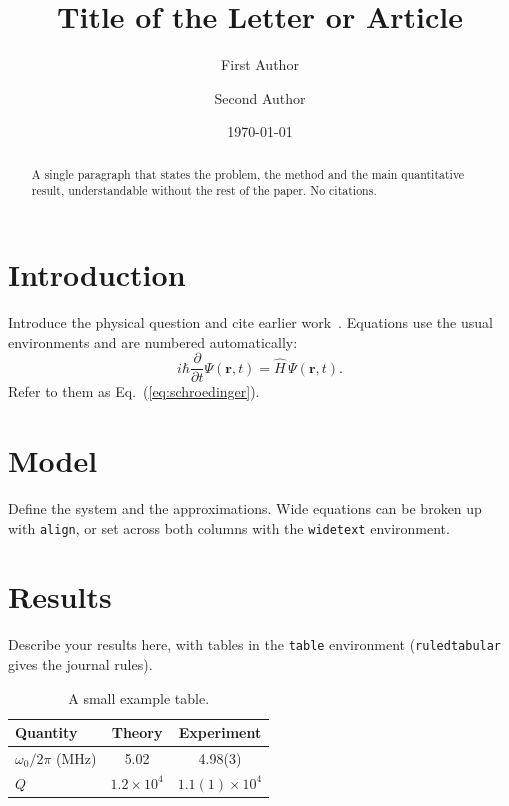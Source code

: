 \documentclass[aps,pra,reprint,amsmath,amssymb,superscriptaddress]{revtex4-2}
\begin{document}
\title{Title of the Letter or Article}

\author{First Author}

\author{Second Author}

\date{\today}

\begin{abstract}
A single paragraph that states the problem, the method and the main quantitative
result, understandable without the rest of the paper. No citations.
\end{abstract}

\maketitle

\section{Introduction}
Introduce the physical question and cite earlier work~\cite{einstein35}.
Equations use the usual environments and are numbered automatically:
\begin{equation}
  i\hbar \frac{\partial}{\partial t}\Psi(\mathbf{r},t) = \hat{H}\,\Psi(\mathbf{r},t).
  \label{eq:schroedinger}
\end{equation}
Refer to them as Eq.~(\ref{eq:schroedinger}).

\section{Model}
Define the system and the approximations. Wide equations can be broken up with
\texttt{align}, or set across both columns with the \texttt{widetext} environment.

\section{Results}
Describe your results here, with tables in the \texttt{table} environment
(\texttt{ruledtabular} gives the journal rules).

\begin{table}
\caption{A small example table.}
\begin{ruledtabular}
\begin{tabular}{lcc}
 Quantity & Theory & Experiment \\
 \hline
 $\omega_0/2\pi$ (MHz) & 5.02 & 4.98(3) \\
 $Q$ & $1.2\times10^{4}$ & $1.1(1)\times10^{4}$ \\
\end{tabular}
\end{ruledtabular}
\end{table}
\end{document}
